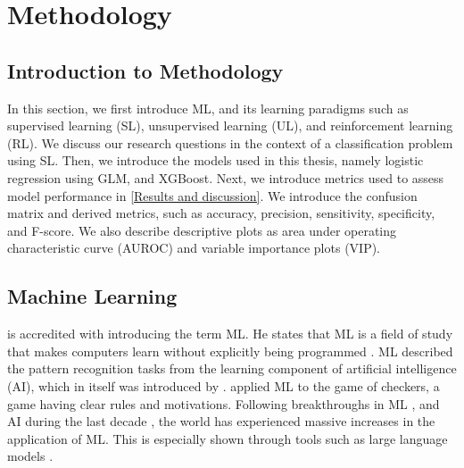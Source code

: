 \section{Methodology}
\label{Methodology}

\subsection{Introduction to Methodology}

In this section, we first introduce ML, and its learning paradigms such as supervised learning (SL), unsupervised learning (UL), and reinforcement learning (RL). We discuss our research questions in the context of a classification problem using SL. Then, we introduce the models used in this thesis, namely logistic regression using GLM, and XGBoost. Next, we introduce metrics used to assess model performance in \autoref{Results and discussion}. We introduce the confusion matrix and derived metrics, such as accuracy, precision, sensitivity, specificity, and F-score. We also describe descriptive plots as area under operating characteristic curve (AUROC) and variable importance plots (VIP).

\subsection{Machine Learning}

\textcite{samuel-some-studies-in-machine-learning-using-the-game-of-checkers} is accredited with introducing the term ML. He states that ML is a field of study that makes computers learn without explicitly being programmed \parencite{samuel-some-studies-in-machine-learning-using-the-game-of-checkers}. ML described the pattern recognition tasks from the learning component of artificial intelligence (AI), which in itself was introduced by \textcite{mccarthy-artificial-intelligence}. \textcite{samuel-some-studies-in-machine-learning-using-the-game-of-checkers} applied ML to the game of checkers, a game having clear rules and motivations. Following breakthroughs in ML \parencite{sutskever-neural-network}, and AI during the last decade \parencite{vaswani-attention-is-all-you-need}, the world has experienced massive increases in the application of ML. This is especially shown through tools such as large language models \parencite{open-ai-gpt-4}.

